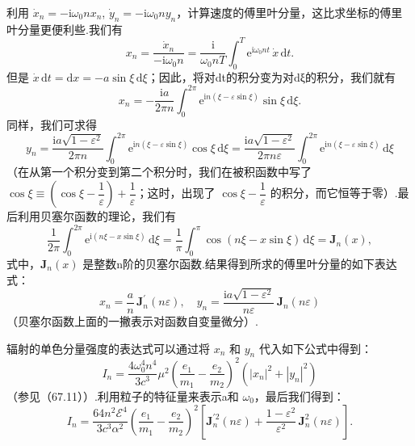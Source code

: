 利用 $\dot{x}_n=-\mathrm{i}\omega_0nx_n$, $\dot{y}_n=-\mathrm{i}\omega_0ny_n$，计算速度的傅里叶分量，这比求坐标的傅里叶分量更便利些.我们有
\begin{equation*}
  x_n=\frac{\dot{x}_n}{-\mathrm{i}\omega_0n}=\frac{\mathrm{i}}{\omega_0nT}\int_0^T\mathrm{e}^{\mathrm{i}\omega_0nt}\,\dot{x}\,\mathrm{d}t.
\end{equation*}
但是 $\dot{x}\,\mathrm{d}t=\mathrm{d}x=-a\sin\xi\,\mathrm{d}\xi$；因此，将对dt的积分变为对dξ的积分，我们就有
\begin{equation*}
  x_n=-\frac{\mathrm{i}a}{2\pi n}\int_0^{2\pi}\mathrm{e}^{\mathrm{i}n(\xi-\varepsilon\sin\xi)}\sin\xi\,\mathrm{d}\xi.
\end{equation*}
同样，我们可求得
\begin{equation*}
  y_n=\frac{\mathrm{i}a\sqrt{1-\varepsilon^2}}{2\pi n}\int_0^{2\pi}\mathrm{e}^{\mathrm{i}n(\xi-\varepsilon\sin\xi)}\cos\xi\,\mathrm{d}\xi
  =\frac{\mathrm{i}a\sqrt{1-\varepsilon^2}}{2\pi n\varepsilon}\int_0^{2\pi}\mathrm{e}^{\mathrm{i}n(\xi-\varepsilon\sin\xi)}\,\mathrm{d}\xi
\end{equation*}
（在从第一个积分变到第二个积分时，我们在被积函数中写了 $\cos\xi\equiv\left(\cos\xi-\dfrac{1}{\varepsilon}\right)+\dfrac{1}{\varepsilon}$；这时，出现了 $\cos\xi-\dfrac{1}{\varepsilon}$ 的积分，而它恒等于零）.最后利用贝塞尔函数的理论，我们有
\begin{equation}
  \frac{1}{2\pi}\int_0^{2\pi}\mathrm{e}^{\mathrm{i}(n\xi-x\sin\xi)}\,\mathrm{d}\xi
  =\frac{1}{\pi}\int_0^{\pi}\cos(n\xi-x\sin\xi)\,\mathrm{d}\xi=\mathbf{J}_n(x),
\end{equation}
式中，$\mathbf{J}_n(x)$ 是整数n阶的贝塞尔函数.结果得到所求的傅里叶分量的如下表达式：
\begin{equation}
  x_n=\frac{a}{n}\,\mathbf{J}_n^{\prime}(n\varepsilon),\quad
  y_n=\frac{\mathrm{i}a\sqrt{1-\varepsilon^2}}{n\varepsilon}\,\mathbf{J}_n(n\varepsilon)
\end{equation}
（贝塞尔函数上面的一撇表示对函数自变量微分）.

辐射的单色分量强度的表达式可以通过将 $x_n$ 和 $y_n$ 代入如下公式中得到：
\begin{equation*}
  I_n=\frac{4\omega_0^4n^4}{3c^3}\mu^2\left(\frac{e_1}{m_1}-\frac{e_2}{m_2}\right)^2\left(|x_n|^2+|y_n|^2\right)
\end{equation*}
（参见（67.11））.利用粒子的特征量来表示a和 $\omega_0$，最后我们得到：
\begin{equation}
  I_n=\frac{64n^2\mathcal{E}^4}{3c^3\alpha^2}\left(\frac{e_1}{m_1}-\frac{e_2}{m_2}\right)^2
  \left[\mathbf{J}_n^{\prime 2}(n\varepsilon)+\frac{1-\varepsilon^2}{\varepsilon^2}\,\mathbf{J}_n^2(n\varepsilon)\right].
\end{equation}

